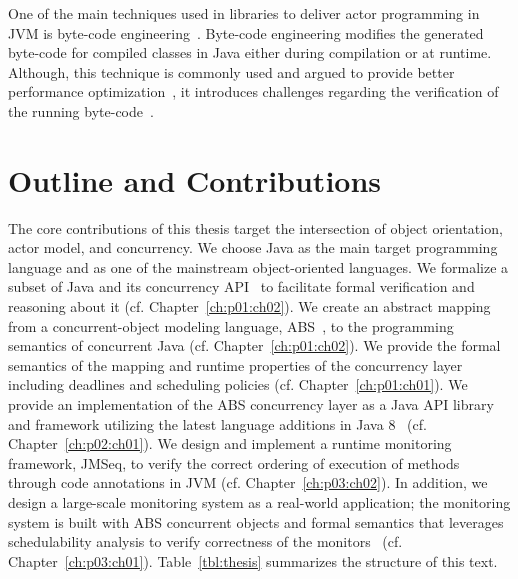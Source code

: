 One of the main techniques used in libraries to deliver actor programming in 
JVM is byte-code engineering~\cite{dahm1999byte,bruneton2002asm,asm}.
Byte-code engineering modifies the generated byte-code for compiled classes in 
Java either during compilation or at runtime.
Although, this technique is commonly used and argued to provide better 
performance optimization~\cite{vallee1999soot}, it introduces challenges 
regarding the verification of the running 
byte-code~\cite{leroy2001java,leroy2003java}.

\section{Outline and Contributions}
\label{sec:intro:contribs}

The core contributions of this thesis target the intersection of object 
orientation, actor model, and concurrency.
We choose Java as the main target programming language and as one of the mainstream 
object-oriented languages. 
We formalize a subset of Java and its concurrency API~\cite{jsr166} to 
facilitate formal verification and reasoning about it (cf. Chapter~\ref{ch:p01:ch02}).
We create an abstract mapping from a concurrent-object modeling language, 
ABS~\cite{johnsen2012abs}, to the programming semantics of concurrent Java (cf. Chapter~\ref{ch:p01:ch02}). 
We provide the formal semantics of the mapping and runtime properties of 
the concurrency layer including deadlines and scheduling policies (cf. Chapter~\ref{ch:p01:ch01}).
We provide an implementation of the ABS concurrency layer as a Java API library 
and framework utilizing the latest language additions 
in Java 8~\cite{jsr335:lambda:translation} (cf. Chapter~\ref{ch:p02:ch01}).
We design and implement a runtime monitoring framework, JMSeq, to verify the
correct ordering of execution of methods through code annotations in JVM (cf. Chapter~\ref{ch:p03:ch02}). 
In addition, we design a large-scale monitoring system as a real-world 
application; the monitoring system is built with ABS concurrent objects 
and formal semantics that leverages schedulability 
analysis to verify correctness of the monitors~\cite{fersman2007task} (cf. Chapter~\ref{ch:p03:ch01}).
Table~\ref{tbl:thesis} summarizes the structure of this text.

